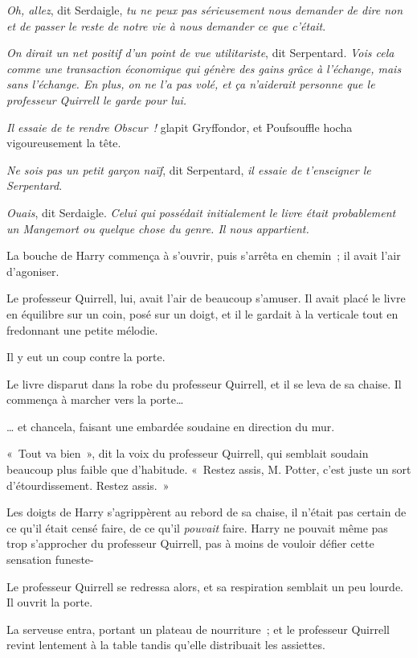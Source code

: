 \emph{Oh, allez}, dit Serdaigle, \emph{tu ne peux pas sérieusement nous demander de dire non et de passer le reste de notre vie à nous demander ce que c'était}.

\emph{On dirait un net positif d'un point de vue utilitariste}, dit Serpentard.
\emph{Vois cela comme une transaction économique qui génère des gains grâce à l'échange, mais sans l'échange.
En plus, on ne l'a pas volé, et ça n'aiderait personne que le professeur Quirrell le garde pour lui.}

\emph{Il essaie de te rendre Obscur~!} glapit Gryffondor, et Poufsouffle hocha vigoureusement la tête.

\emph{Ne sois pas un petit garçon naïf}, dit Serpentard, \emph{il essaie de t'enseigner le Serpentard}.

\emph{Ouais}, dit Serdaigle.
\emph{Celui qui possédait initialement le livre était probablement un Mangemort ou quelque chose du genre.
Il nous appartient.}

La bouche de Harry commença à s'ouvrir, puis s'arrêta en chemin~; il avait l'air d'agoniser.

Le professeur Quirrell, lui, avait l'air de beaucoup s'amuser.
Il avait placé le livre en équilibre sur un coin, posé sur un doigt, et il le gardait à la verticale tout en fredonnant une petite mélodie.

Il y eut un coup contre la porte.

Le livre disparut dans la robe du professeur Quirrell, et il se leva de sa chaise.
Il commença à marcher vers la porte…

… et chancela, faisant une embardée soudaine en direction du mur.

«~Tout va bien~», dit la voix du professeur Quirrell, qui semblait soudain beaucoup plus faible que d'habitude.
«~Restez assis, M. Potter, c'est juste un sort d'étourdissement.
Restez assis.~»

Les doigts de Harry s'agrippèrent au rebord de sa chaise, il n'était pas certain de ce qu'il était censé faire, de ce qu'il \emph{pouvait} faire.
Harry ne pouvait même pas trop s'approcher du professeur Quirrell, pas à moins de vouloir défier cette sensation funeste-

Le professeur Quirrell se redressa alors, et sa respiration semblait un peu lourde.
Il ouvrit la porte.

La serveuse entra, portant un plateau de nourriture~; et le professeur Quirrell revint lentement à la table tandis qu'elle distribuait les assiettes.

